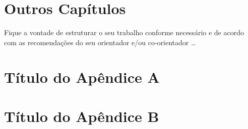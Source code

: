 \documentclass[
  12pt,		%
  a4paper,	%
  openright,%
  oneside,	%
  chapter=TITLE,		%
  section=TITLE,		%
  english,	%
  french,	%
  spanish,	%
  brazil
]{abntex2}
\begin{document}
     
     \chapter{Outros Capítulos}
    
        Fique a vontade de estruturar o seu trabalho conforme necessário e de acordo com as recomendações do seu orientador e/ou co-orientador \dots
    
    
    \postextual
    
    
    
    
    
    \begin{apendicesenv}
        
        \chapter{Título do Apêndice A}
            \lipsum[50]
        
        \chapter{Título do Apêndice B}
            \lipsum[51]
        
    \end{apendicesenv}
    
\end{document}
